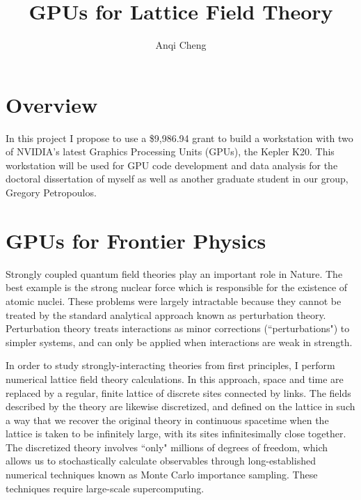 \documentclass[11pt]{article}
\begin{document}
  \title{GPUs for Lattice Field Theory}
  \author{Anqi Cheng}
  \maketitle

  \section*{Overview} %
  In this project  I propose to use a \$9,986.94 grant to build a workstation with two of NVIDIA's latest  Graphics Processing Units (GPUs), the Kepler K20.
  This workstation will be used for GPU code development and data analysis for the doctoral dissertation of myself as well as another graduate student in our group, Gregory Petropoulos.\\
  
  \section*{GPUs for Frontier Physics}
  Strongly coupled quantum field theories play an important role in Nature.
  The best example is the strong nuclear force which is responsible for the existence of atomic nuclei.
  These problems were largely intractable because they cannot be treated by the standard analytical approach known as perturbation theory. 
  Perturbation theory treats interactions as minor corrections (``perturbations") to simpler systems, and can only be applied when interactions are weak in strength.

  In order to study strongly-interacting theories from first principles, I perform numerical lattice field theory calculations. 
  In this approach, space and time are replaced by a regular, finite lattice of discrete sites connected by links. 
  The fields described by the theory are likewise discretized, and defined on the lattice in such a way that we recover the original theory in continuous spacetime when the lattice is taken to be infinitely large, with its sites infinitesimally close together. 
  The discretized theory involves ``only" millions of degrees of freedom, which allows us to stochastically calculate observables through long-established numerical techniques known as Monte Carlo importance sampling. 
  These techniques require large-scale supercomputing.
\end{document}
